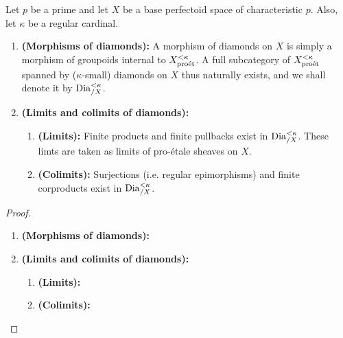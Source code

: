                 \begin{proposition} \label{prop: the_category_of_diamonds}
                    Let $p$ be a prime and let $X$ be a base perfectoid space of characteristic $p$. Also, let $\kappa$ be a regular cardinal.
                        \begin{enumerate}
                            \item \textbf{(Morphisms of diamonds):} A morphism of diamonds on $X$ is simply a morphism of groupoids internal to $X_{\mathrm{pro\acute{e}t}}^{< \kappa}$. A full subcategory of $X_{\mathrm{pro\acute{e}t}}^{< \kappa}$ spanned by ($\kappa$-small) diamonds on $X$ thus naturally exists, and we shall denote it by $\mathrm{Dia}_{/X}^{< \kappa}$. 
                            \item \textbf{(Limits and colimits of diamonds):}
                                \begin{enumerate}
                                    \item \textbf{(Limits):} Finite products and finite pullbacks exist in $\mathrm{Dia}_{/X}^{< \kappa}$. These limts are taken as limits of pro-\'etale sheaves on $X$. 
                                    \item \textbf{(Colimits):} Surjections (i.e. regular epimorphisms) and finite corproducts exist in $\mathrm{Dia}_{/X}^{< \kappa}$.
                                \end{enumerate}
                        \end{enumerate}
                \end{proposition}
                    \begin{proof}
                        \noindent
                        \begin{enumerate}
                            \item \textbf{(Morphisms of diamonds):}
                            \item \textbf{(Limits and colimits of diamonds):}
                                \begin{enumerate}
                                    \item \textbf{(Limits):}
                                    \item \textbf{(Colimits):}
                                \end{enumerate}
                        \end{enumerate}
                    \end{proof}
                    
